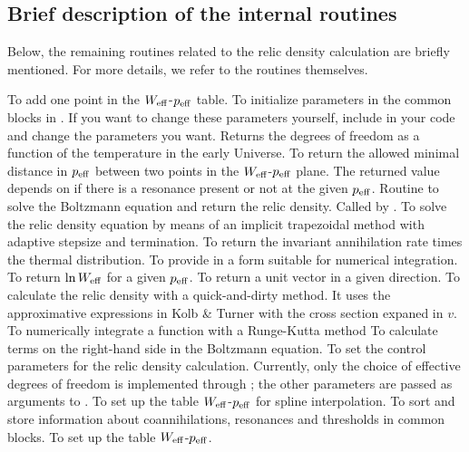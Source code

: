 \subsection{Brief description of the internal routines}

Below, the remaining routines related to the relic density calculation
are briefly mentioned. For more details, we refer to the routines
themselves.

\begin{brief-subs}
  To add one point in the $W_{\rm eff}$-$p_{\rm eff}$ table.
  To initialize parameters in the common blocks in . If
  you want to change these parameters yourself, include 
  in your code and change the parameters you want.
  Returns the degrees of freedom as a
  function of the temperature in the early Universe.
  To return the allowed minimal distance in $p_{\rm
  eff}$ between two points in the $W_{\rm eff}$-$p_{\rm eff}$ plane.
  The returned value depends on if there is a resonance present or not
  at the given $p_{\rm eff}$.
 Routine to solve the Boltzmann equation and return the relic density. Called by .
  To solve the relic density equation by means of an
  implicit trapezoidal method with adaptive stepsize and termination.
  To return the invariant annihilation rate times the
  thermal distribution.
  To provide  in a form suitable for
  numerical integration.
  To return $\ln W_{\rm eff}$ for a given $p_{\rm
  eff}$.
  To return a unit vector in a given direction.
  To calculate the relic density with a
  quick-and-dirty method. It uses the approximative expressions in
  Kolb \& Turner with the cross section expaned in $v$.
  To numerically integrate a function with a
  Runge-Kutta method
  To calculate terms on the right-hand side in the
  Boltzmann equation.
  To set the control parameters for the relic density calculation. Currently, only the choice of effective degrees of freedom is implemented through ; the other parameters are passed as arguments to .
  To set up the table $W_{\rm eff}$-$p_{\rm eff}$ for
  spline interpolation.
  To sort and store information about coannihilations,
  resonances and thresholds in common blocks.
  To set up the table $W_{\rm eff}$-$p_{\rm eff}$.

\end{brief-subs}
